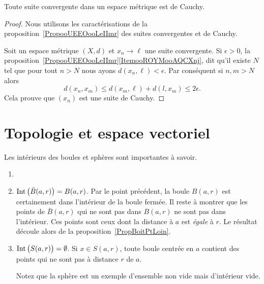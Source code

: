 \begin{proposition}     \label{PROPooZZNWooHghltd}
    Toute suite convergente dans un espace métrique est de Cauchy.
\end{proposition}

\begin{proof}
    Nous utilisons les caractérisations de la proposition~\ref{PropooUEEOooLeIImr} des suites convergentes et de Cauchy.

    Soit un espace métrique \( (X,d)\) et \( x_n\to\ell\) une suite convergente. Si \( \epsilon>0\), la proposition~\ref{PropooUEEOooLeIImr}\ref{ItemooROYMooAQCXnj}, dit qu'il existe \( N\) tel que pour tout \( n>N\) nous ayons \( d(x_n,\ell)<\epsilon\). Par conséquent si \( n,m>N\) alors
    \begin{equation}
        d(x_n,x_m)\leq d(x_m,\ell)+d(l,x_m)\leq 2\epsilon.
    \end{equation}
    Cela prouve que \( (x_n)\) est une suite de Cauchy.
\end{proof}

\section{Topologie et espace vectoriel}



\begin{example}		%
	Les intérieurs des boules et sphères sont importantes à savoir.
	\begin{enumerate}
		\item
	
		\item
			$\operatorname{Int}\big( \bar B(a,r) \big)=B(a,r)$. Par le point précédent, la boule $B(a,r)$ est certainement dans l'intérieur de la boule fermée. Il reste à montrer que les points de $\bar B(a,r)$ qui ne sont pas dans $B(a,r)$ ne sont pas dans l'intérieur. Ces points sont ceux dont la distance à $a$ est \emph{égale} à $r$. Le résultat découle alors de la proposition~\ref{PropBoitPtLoin}.

		\item
			$\operatorname{Int}\big( S(a,r) \big)=\emptyset$. Si $x\in S(a,r)$, toute boule centrée en $a$ contient des points qui ne sont pas à distance $r$ de $a$.

			Notez que la sphère est un exemple d'ensemble non vide mais d'intérieur vide.
	\end{enumerate}
\end{example}


